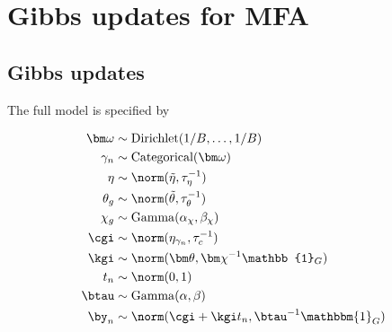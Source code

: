 \chapter{Gibbs updates for MFA} \label{app:mfa_updates}





\section{Gibbs updates}

The full model is specified by


\begin{equation} \label{eq:mfamodel}
\begin{aligned}
\bm \omega & \sim \text{Dirichlet}(1 / B, \ldots, 1 / B) \\
\gamma_n & \sim \text{Categorical}(\bm \omega) \\
\eta & \sim \norm(\tilde{\eta}, \tau_\eta^{-1}) \\
\theta_g & \sim \norm(\tilde{\theta}, \tau_\theta^{-1}) \\
\chi_g & \sim \mathrm{Gamma}(\alpha_\chi, \beta_\chi) \\
\cgi & \sim \norm(\eta_{\gamma_n}, \tau_c^{-1}) \\
\kgi & \sim \norm(\bm \theta, \bm \chi^{-1} \mathbb{1}_G) \\
t_n & \sim \norm(0, 1) \\
\btau & \sim \mathrm{Gamma}(\alpha, \beta) \\
\by_n & \sim \norm(\cgi + \kgi t_n, \btau^{-1} \mathbbm{1}_G)
\end{aligned}
\end{equation}

